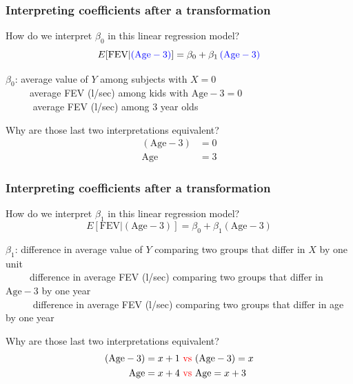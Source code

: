 \documentclass[12pt, 
hyperref={colorlinks=true, linkcolor=blue, urlcolor=cyan},dvipsnames]{beamer}
\begin{document}
\begin{frame}
\frametitle{Interpreting coefficients after a transformation}
How do we interpret $\beta_0$ in this linear regression model? $$E[\text{FEV}|\color{blue}(\text{Age}-3)\color{black}] = \beta_0 + \beta_1 \color{blue}\left(\text{Age}-3\right)\color{black}$$

\vspace{-0.5cm}
$\beta_0$: average value of $Y$ among subjects with $X = 0$ \\ \pause
\ \ \ \ \ average FEV (l/sec) among kids with $\text{Age} -3 = 0$\\ \pause
\ \ \ \ \ \color{blue} average FEV (l/sec) among 3 year olds \color{black} \pause

Why are those last two interpretations equivalent?
\begin{align*}
(\text{Age}-3) &= 0 \\ 
\text{Age} &= 3
\end{align*}
\end{frame}

\begin{frame}
\frametitle{Interpreting coefficients after a transformation}
How do we interpret $\beta_1$ in this linear regression model? $$E[\text{FEV}|(\text{Age}-3)] = \beta_0 + \beta_1 \left(\text{Age}-3\right)$$

\vspace{-0.5cm}
$\beta_1$: difference in average value of $Y$ comparing two groups that differ in $X$ by one unit\\ \pause
\ \ \ \ \ difference in average FEV (l/sec) comparing two groups that differ in $\text{Age}-3$ by one year\\ \pause
\ \ \ \ \ \color{blue} difference in average FEV (l/sec) comparing two groups that differ in age by one year \color{black}\pause

Why are those last two interpretations equivalent?
\begin{align*}
(\text{Age}-3) = x+1 &\color{red} \text{ vs } \color{black} (\text{Age}-3) = x \\
\text{Age} = x+4 &\color{red} \text{ vs } \color{black} \text{Age} = x+3
\end{align*}
\end{frame}
\end{document}
